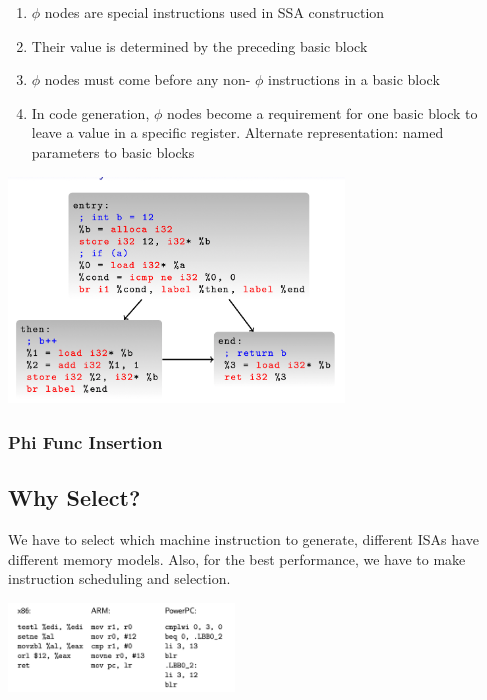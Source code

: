 \documentclass[a4paper]{exam}
\theoremstyle{definition}
\begin{document}
\begin{enumerate}
  \item  $\phi$ nodes are special instructions used in SSA construction
  \item Their value is determined by the preceding basic block
  \item $\phi$ nodes must come before any non- $\phi$ instructions in a basic
        block
  \item In code generation, $\phi$ nodes become a requirement for one
        basic block to leave a value in a specific register.
        Alternate representation: named parameters to basic blocks
\end{enumerate}
\begin{center}
  \includegraphics[height=6cm]{img/Snipaste_2021-04-05_17-40-27.png}
\end{center}

\subsubsection{Phi Func Insertion}
\subsection{Why Select?}
We have to select which machine instruction to generate, different ISAs have different memory models. Also, for the best performance, we have to make instruction scheduling and selection.
\begin{center}
  \includegraphics[width=6cm]{img/Snipaste_2021-04-05_17-41-52.png}
\end{center}
\end{document}
